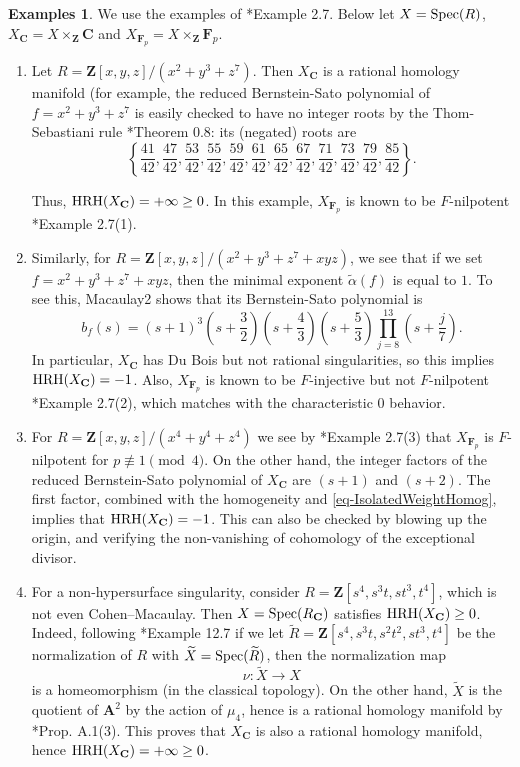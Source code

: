\documentclass[letterpaper,11pt]{amsart}
\theoremstyle{plain}
\theoremstyle{definition}
\newtheorem{egs}[thm]{Examples}
\theoremstyle{remark}
\def\Z{{\mathbf Z}}
\def\C{{\mathbf C}}
\def\A{{\mathbf A}}
\begin{document}
\begin{egs} \label{eg-Examples} We use the examples of \cite{Srinivas-Takagi}*{Example 2.7}. Below let $X = {\rm Spec}(R)$, $X_\C = X\times_\Z \C$ and $X_{\mathbf F_p} = X\times_{\Z} \mathbf F_p$.

\begin{enumerate} \item Let $R = \Z[x,y,z]/(x^2+y^3+z^7)$. Then $X_{\C}$ is a rational homology manifold (for example, the reduced Bernstein-Sato polynomial of $f = x^2+y^3+z^7$ is easily checked to have no integer roots by the Thom-Sebastiani rule \cite{SaitoMicrolocal}*{Theorem 0.8}: its (negated) roots are
\[ \left\{ \frac{41}{42}, \frac{47}{42}, \frac{53}{42}, \frac{55}{42}, \frac{59}{42}, \frac{61}{42}, \frac{65}{42},\frac{67}{42},\frac{71}{42},\frac{73}{42},\frac{79}{42},\frac{85}{42} \right\}.\] 

Thus, ${\rm HRH}(X_\C) = +\infty \geq 0$. In this example, $X_{\mathbf F_p}$ is known to be $F$-nilpotent \cite{Srinivas-Takagi}*{Example 2.7(1)}.

\item Similarly, for $R = \Z[x,y,z]/(x^2+y^3+z^7+xyz)$, we see that if we set $f = x^2+y^3+z^7+xyz$, then the minimal exponent $\widetilde{\alpha}(f)$ is equal to $1$. To see this, Macaulay2 shows that its Bernstein-Sato polynomial is
\[
b_f(s)
= (s+1)^3
  \left(s+\frac{3}{2}\right)
  \left(s+\frac{4}{3}\right)
  \left(s+\frac{5}{3}\right)
  \prod_{j=8}^{13}\left(s+\frac{j}{7}\right).
\]
In particular, $X_\C$ has Du Bois but not rational singularities, so this implies ${\rm HRH}(X_\C) = -1$. Also, $X_{\mathbf F_p}$ is known to be $F$-injective but not $F$-nilpotent \cite{Srinivas-Takagi}*{Example 2.7(2)}, which matches with the characteristic $0$ behavior.

\item For $R = \Z[x,y,z]/(x^4+y^4+z^4)$ we see by \cite{Srinivas-Takagi}*{Example 2.7(3)} that $X_{\mathbf F_p}$ is $F$-nilpotent for $p \not \equiv 1 \pmod 4$. On the other hand, the integer factors of the reduced Bernstein-Sato polynomial of $X_{\mathbf C}$ are $(s+1)$ and $(s+2)$. The first factor, combined with the homogeneity and \eqref{eq-IsolatedWeightHomog}, implies that ${\rm HRH}(X_{\mathbf C}) = -1$. This can also be checked by blowing up the origin, and verifying the non-vanishing of cohomology of the exceptional divisor. 

\item For a non-hypersurface singularity, consider $R = \Z[s^4,s^3t,st^3,t^4]$, which is not even Cohen--Macaulay. Then $X = {\rm Spec}(R_\C)$ satisfies ${\rm HRH}(X_\C) \geq 0$. Indeed, following \cite{MPLocCoh}*{Example 12.7} if we let $\widetilde{R} = \Z[s^4,s^3t,s^2t^2,st^3,t^4]$ be the normalization of $R$ with $\widetilde{X} = {\rm Spec}(\widetilde{R})$, then the normalization map 
\[ \nu \colon \widetilde{X} \to X\]
is a homeomorphism (in the classical topology). On the other hand, $\widetilde{X}$ is the quotient of $\A^2$ by the action of $\mu_4$, hence is a rational homology manifold by \cite{Brion}*{Prop. A.1(3)}. This proves that $X_{\C}$ is also a rational homology manifold, hence ${\rm HRH}(X_{\C}) = +\infty \geq 0$.


\end{enumerate}
\end{egs}
\end{document}
